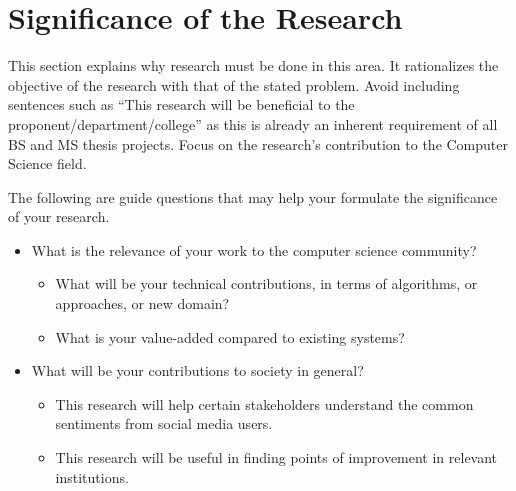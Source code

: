 \begin{comment}

%
%
Generally, one paragraph should be allotted for each of your research objectives.

Each paragraph contains a brief overview of the concept/theory and the purpose of doing the associated objective.

Each paragraph also includes a description of the scope/limitation of your study.

* Please refer to the slides for examples.

\end{comment}


\section{Significance of the Research}
\label{sec:significance}

This section explains why research must be done in this area.  It rationalizes the objective of the research with that of the stated problem. 
Avoid including sentences such as ``This research will be beneficial to the proponent/department/college'' as this is already an inherent
requirement of all BS and MS thesis projects.  Focus on the research's contribution to the Computer Science field.

The following are guide questions that may help your formulate the significance of your research. 


%
%
\begin{itemize}
	\item  What is the relevance of your work to the computer science community? 

	\begin{itemize} 
	\item What will be your technical contributions, in terms of algorithms, or approaches, or new domain? 
	\item What is your value-added compared to existing systems? 
	\end{itemize}

	\item What will be your contributions to society in general? 
    \begin{itemize}
		\item This research will help certain stakeholders understand the common sentiments from social media users.
		\item This research will be useful in finding points of improvement in relevant institutions.
	\end{itemize}
\end{itemize}




